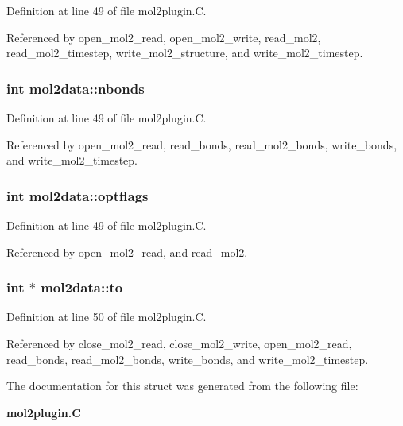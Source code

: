 Definition at line 49 of file mol2plugin.C.

Referenced by open\_\-mol2\_\-read, open\_\-mol2\_\-write, read\_\-mol2, read\_\-mol2\_\-timestep, write\_\-mol2\_\-structure, and write\_\-mol2\_\-timestep.
\subsubsection{\setlength{\rightskip}{0pt plus 5cm}int mol2data::nbonds}\label{structmol2data_m3}




Definition at line 49 of file mol2plugin.C.

Referenced by open\_\-mol2\_\-read, read\_\-bonds, read\_\-mol2\_\-bonds, write\_\-bonds, and write\_\-mol2\_\-timestep.
\subsubsection{\setlength{\rightskip}{0pt plus 5cm}int mol2data::optflags}\label{structmol2data_m4}




Definition at line 49 of file mol2plugin.C.

Referenced by open\_\-mol2\_\-read, and read\_\-mol2.
\subsubsection{\setlength{\rightskip}{0pt plus 5cm}int $\ast$ mol2data::to}\label{structmol2data_m7}




Definition at line 50 of file mol2plugin.C.

Referenced by close\_\-mol2\_\-read, close\_\-mol2\_\-write, open\_\-mol2\_\-read, read\_\-bonds, read\_\-mol2\_\-bonds, write\_\-bonds, and write\_\-mol2\_\-timestep.

The documentation for this struct was generated from the following file:\begin{CompactItemize}
\item 
{\bf mol2plugin.C}\end{CompactItemize}
